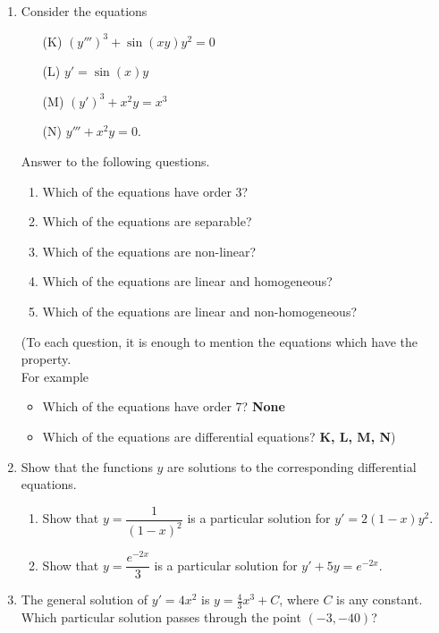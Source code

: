 \documentclass[12pt]{article}
\newcommand{\ratkaisu}[1]{{\color{blue}\quad\textrm{Solution } #1}}
\renewcommand{\ratkaisu}[1]{}
\begin{document}
\begin{enumerate}
\item Consider the equations
\begin{enumerate}
\item [(K)] $(y''')^3+\sin(xy)y^2=0$
\item [(L)] $y'=\sin(x)y$
\item [(M)] $(y')^3+x^2y=x^3$
\item [(N)] $y'''+x^2y=0$.
\end{enumerate}
Answer to the following questions.
\begin{enumerate}
\item Which of the equations have order $3$?
\item Which of the equations are separable?
\item Which of the equations are non-linear?
\item Which of the equations are linear and homogeneous?
\item Which of the equations are linear and non-homogeneous?
\end{enumerate}
(To each question, it is enough to mention the equations which have the property.\\ For example
\begin{itemize}
\item Which of the equations have order $7$? \textbf{None}
\item Which of the equations are differential equations? \textbf{K, L, M, N})
\end{itemize}

\item Show that the functions $y$ are solutions to the corresponding differential equations.
\begin{enumerate}
\item Show that $y=\dfrac{1}{(1-x)^2}$ is a particular solution for $y'=2(1-x)y^2$.
\item Show that $y=\dfrac{e^{-2x}}{3}$ is a particular solution for $y'+5y=e^{-2x}$.
\end{enumerate}
\ratkaisu{The derivative is
$$
y'=\frac{d}{dx}(1-x)^{-1}=-1\cdot (1-x)^{-1-1}\frac{d}{dx}(1-x)=-1\cdot (1-x)^{-2}\cdot(-1)=\frac{1}{(1-x)^2}=y^2
$$}

\item The general solution of $y'=4x^2$ is $y=\frac{4}{3}x^3+C$, where $C$ is any constant. Which particular solution passes through the point $(-3,-40)$?
\ratkaisu{We have $y(x)=y=\frac{4}{3}x^3+C.$ Set $x=-3$ and $y(-3)=-30$ to obtain
$$
-30=\frac{4}{3}(-3)^3+C,
$$
that is
$$
-30=-36+C.
$$
We have $C=6$. The desired solution is $y(x)=y=\frac{4}{3}x^3+6$.
}
\newpage


\end{enumerate}
\end{document}

